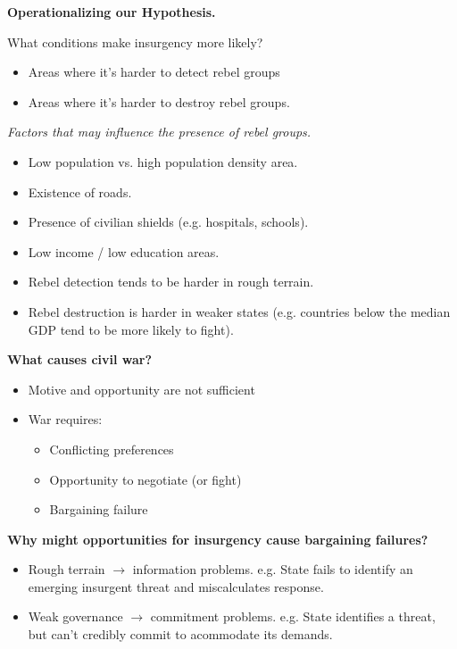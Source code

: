 \documentclass{article}
\begin{document}
{\bf Operationalizing our Hypothesis.}

What conditions make insurgency more likely?

\begin{itemize}
  \item Areas where it's harder to detect rebel groups
  \item Areas where it's harder to destroy rebel groups.
\end{itemize}

{\it Factors that may influence the presence of rebel groups.}

\begin{itemize}
  \item Low population vs. high population density area.
  \item Existence of roads.
  \item Presence of civilian shields (e.g. hospitals, schools).
  \item Low income / low education areas.
  \item Rebel detection tends to be harder in rough terrain.
  \item Rebel destruction is harder in weaker states (e.g. countries below the median GDP tend to be more likely to fight).
\end{itemize}

{\bf What causes civil war?}

\begin{itemize}
  \item Motive and opportunity are not sufficient
  \item War requires:
    \begin{itemize}
      \item Conflicting preferences
      \item Opportunity to negotiate (or fight)
      \item Bargaining failure
    \end{itemize}
\end{itemize}

{\bf Why might opportunities for insurgency cause bargaining failures?}

\begin{itemize}
  \item Rough terrain $\to$ information problems.  e.g. State fails to identify an emerging insurgent threat and miscalculates response.
  \item Weak governance $\to$ commitment problems. e.g. State identifies a threat, but can't credibly commit to acommodate its demands.
\end{itemize}
\end{document}
